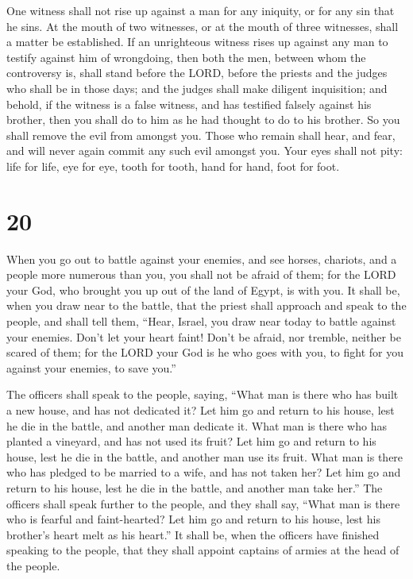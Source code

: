  One witness shall not rise up against a man for any
iniquity, or for any sin that he sins. At the mouth of two witnesses, or
at the mouth of three witnesses, shall a matter be established.
 If an unrighteous witness rises up against any man to
testify against him of wrongdoing,  then both the men,
between whom the controversy is, shall stand before the LORD, before the
priests and the judges who shall be in those days;  and the
judges shall make diligent inquisition; and behold, if the witness is a
false witness, and has testified falsely against his brother,
 then you shall do to him as he had thought to do to his
brother. So you shall remove the evil from amongst you. 
Those who remain shall hear, and fear, and will never again commit any
such evil amongst you.  Your eyes shall not pity: life for
life, eye for eye, tooth for tooth, hand for hand, foot for foot.

\hypertarget{section-19}{%
\section{20}\label{section-19}}

 When you go out to battle against your enemies, and see
horses, chariots, and a people more numerous than you, you shall not be
afraid of them; for the LORD your God, who brought you up out of the
land of Egypt, is with you.  It shall be, when you draw near
to the battle, that the priest shall approach and speak to the people,
 and shall tell them, ``Hear, Israel, you draw near today to
battle against your enemies. Don't let your heart faint! Don't be
afraid, nor tremble, neither be scared of them;  for the
LORD your God is he who goes with you, to fight for you against your
enemies, to save you.''

 The officers shall speak to the people, saying, ``What man
is there who has built a new house, and has not dedicated it? Let him go
and return to his house, lest he die in the battle, and another man
dedicate it.  What man is there who has planted a vineyard,
and has not used its fruit? Let him go and return to his house, lest he
die in the battle, and another man use its fruit.  What man
is there who has pledged to be married to a wife, and has not taken her?
Let him go and return to his house, lest he die in the battle, and
another man take her.''  The officers shall speak further to
the people, and they shall say, ``What man is there who is fearful and
faint-hearted? Let him go and return to his house, lest his brother's
heart melt as his heart.''  It shall be, when the officers
have finished speaking to the people, that they shall appoint captains
of armies at the head of the people.

